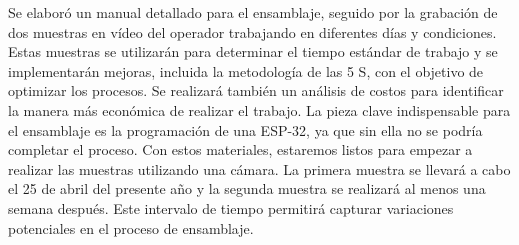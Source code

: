     Se elaboró un manual detallado para el ensamblaje, seguido por la grabación de dos muestras en vídeo del operador trabajando en diferentes días y condiciones. Estas muestras se utilizarán para determinar el tiempo estándar de trabajo y se implementarán mejoras, incluida la metodología de las 5 S, con el objetivo de optimizar los procesos. Se realizará también un análisis de costos para identificar la manera más económica de realizar el trabajo. La pieza clave indispensable para el ensamblaje es la programación de una ESP-32, ya que sin ella no se podría completar el proceso. Con estos materiales, estaremos listos para empezar a realizar las muestras utilizando una cámara. La primera muestra se llevará a cabo el 25 de abril del presente año y la segunda muestra se realizará al menos una semana después. Este intervalo de tiempo permitirá capturar variaciones potenciales en el proceso de ensamblaje.
